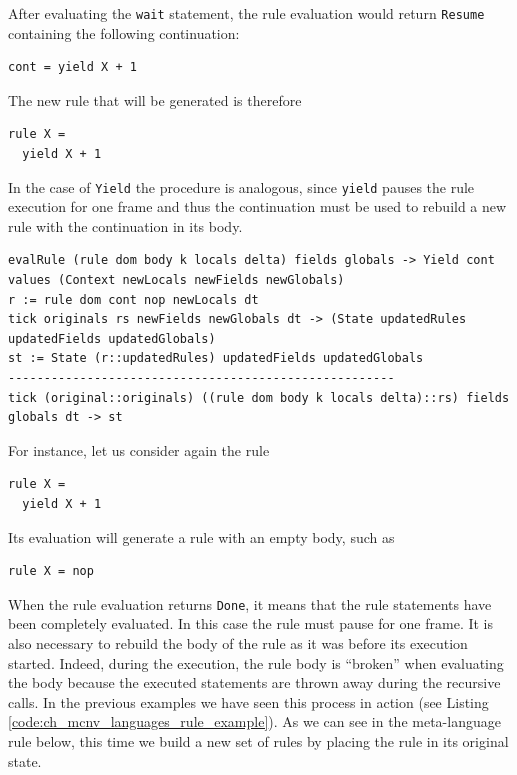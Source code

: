 \noindent
After evaluating the \texttt{wait} statement, the rule evaluation would return \texttt{Resume} containing the following continuation:

\begin{lstlisting}
cont = yield X + 1
\end{lstlisting}

\noindent
The new rule that will be generated is therefore

\begin{lstlisting}
rule X =
  yield X + 1
\end{lstlisting}

\noindent
In the case of \texttt{Yield} the procedure is analogous, since \texttt{yield} pauses the rule execution for one frame and thus the continuation must be used to rebuild a new rule with the continuation in its body.

\begin{lstlisting}
evalRule (rule dom body k locals delta) fields globals -> Yield cont values (Context newLocals newFields newGlobals)
r := rule dom cont nop newLocals dt
tick originals rs newFields newGlobals dt -> (State updatedRules updatedFields updatedGlobals)
st := State (r::updatedRules) updatedFields updatedGlobals
------------------------------------------------------
tick (original::originals) ((rule dom body k locals delta)::rs) fields globals dt -> st
\end{lstlisting}

For instance, let us consider again the rule

\begin{lstlisting}
rule X =
  yield X + 1
\end{lstlisting}

\noindent
Its evaluation will generate a rule with an empty body, such as

\begin{lstlisting}
rule X = nop
\end{lstlisting}

\noindent
When the rule evaluation returns \texttt{Done}, it means that the rule statements have been completely evaluated. In this case the rule must pause for one frame. It is also necessary to rebuild the body of the rule as it was before its execution started. Indeed, during the execution, the rule body is ``broken'' when evaluating the body because the executed statements are thrown away during the recursive calls. In the previous examples we have seen this process in action (see Listing \ref{code:ch_mcnv_languages_rule_example}). As we can see in the meta-language rule below, this time we build a new set of rules by placing the rule in its original state.


